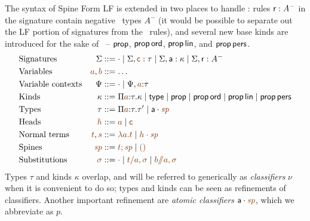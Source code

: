 The syntax of Spine Form LF is extended in two places to handle \sls:
rules ${\sf r} : A^-$ in the signature contain negative \sls~types
$A^-$ (it would be possible to separate out the LF portion of
signatures from the \sls~rules), and several new base kinds
are introduced for the sake of \sls~-- ${\sf prop}$, ${\sf prop}\,{\sf
  ord}$, ${\sf prop}\,{\sf lin}$, and ${\sf prop}\,{\sf pers}$.
\begin{align*}
& \mbox{Signatures} & \Sigma & ::= \cdot 
  \mid \Sigma, \lf{\sf c} : \tau
  \mid \Sigma, {\sf a} : \kappa
  \mid \Sigma, {\sf r} : A^-
\\
& \mbox{Variables} & \lf{a}, \lf{b} & ::= \ldots
\\
& \mbox{Variable contexts} & \Psi & ::= \cdot
  \mid \Psi, \lf{a} {:} \tau 
\\
& \mbox{Kinds} & \kappa & ::=  \lfpi{a}{\tau}{\kappa} 
  \mid {\sf type}
  \mid {\sf prop}
  \mid {\sf prop}\,{\sf ord}
  \mid {\sf prop}\,{\sf lin}
  \mid {\sf prop}\,{\sf pers}
\\
& \mbox{Types} & \tau & ::= \lfpi{a}{\tau}{\tau'} 
  \mid \lfroot{\sf a}{\spi}
\\
& \mbox{Heads} & \lf{h} & ::= \lf{a} \mid \lf{\sf c}
\\
& \mbox{Normal terms} & \lf{t}, \lf{s} & ::= \lf{\lambda a.t}
  \mid \lf{\lfroot{h}{\spi}}
\\
& \mbox{Spines} & \lf{\spi} & ::= \lf{t; \spi} \mid \lf{\lfnil}
\\
& \mbox{Substitutions} & \lf{\sigma} & ::= \lf{\cdot}
  \mid \lf{t/a, \sigma}
  \mid \lf{b/\!\!/a, \sigma}
\end{align*}
\noindent
Types $\tau$ and kinds $\kappa$ overlap, and will be referred to
generically as {\it classifiers} $\nu$ when it is convenient to do so;
types and kinds can be seen as refinements of classifiers. Another
important refinement are {\it atomic classifiers} $\lfroot{\sf
  a}{\spi}$, which we abbreviate as $p$.

